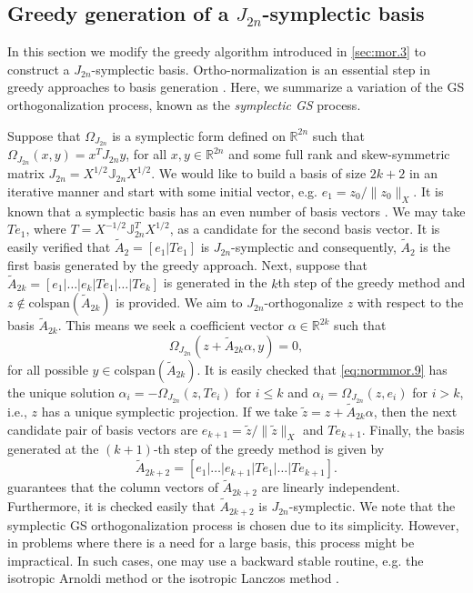 \subsection{Greedy generation of a $J_{2n}$-symplectic basis} \label{sec:normmor.2}
In this section we modify the greedy algorithm introduced in \cref{sec:mor.3} to construct a $J_{2n}$-symplectic basis. Ortho-normalization is an essential step in greedy approaches to basis generation \cite{hesthaven2015certified,quarteroni2015reduced}. Here, we summarize a variation of the GS orthogonalization process, known as the \emph{symplectic GS} process.

Suppose that $\Omega_{J_{2n}}$ is a symplectic form defined on $\mathbb R^{2n}$ such that $\Omega_{J_{2n}}(x,y) = x^T J_{2n} y$, for all $x,y\in \mathbb R^{2n}$ and some full rank and skew-symmetric matrix $J_{2n} = X^{1/2} \mathbb J_{2n} X^{1/2}$. We would like to build a basis of size $2k+2$ in an iterative manner and start with some initial vector, e.g. $e_1 = z_0/\| z_0 \|_X$. It is known that a symplectic basis has an even number of basis vectors \cite{Marsden:2010:IMS:1965128}. We may take $Te_1$, where $T = X^{-1/2} \mathbb J_{2n}^{T}X^{1/2}$, as a candidate for the second basis vector. It is easily verified that $\tilde A_2=[e_1|Te_1]$ is $J_{2n}$-symplectic and consequently, $\tilde A_2$ is the first basis generated by the greedy approach. Next, suppose that $\tilde A_{2k} = [e_1|\dots|e_k|Te_1|\dots|Te_k]$ is generated in the $k$th step of the greedy method and $z\not \in \text{colspan}\left(\tilde A_{2k}\right)$ is provided. We aim to $J_{2n}$-orthogonalize $z$ with respect to the basis $\tilde A_{2k}$. This means we seek a coefficient vector $\alpha\in \mathbb R^{2k}$ such that
\begin{equation} \label{eq:normmor.9}
	\Omega_{J_{2n}}\left( z + \tilde A_{2k}\alpha ,  y \right) = 0,
\end{equation}
for all possible $y \in \text{colspan}(\tilde A_{2k})$. It is easily checked that \eqref{eq:normmor.9} has the unique solution $\alpha_i = -\Omega_{J_{2n}}(z,Te_i)$ for $i\leq k$ and $\alpha_i = \Omega_{J_{2n}}(z,e_i)$ for $i>k$, i.e., $z$ has a unique symplectic projection. If we take $\tilde z = z + \tilde A_{2k}\alpha$, then the next candidate pair of basis vectors are $e_{k+1} = \tilde z / \| \tilde z \|_X$ and $Te_{k+1}$. Finally, the basis generated at the $(k+1)$-th step of the greedy method is given by
\begin{equation} \label{eq:normmor.11}
	\tilde A_{2k+2} = [e_1|\dots|e_{k+1}|Te_1|\dots|Te_{k+1}].
\end{equation}
 guarantees that the column vectors of $\tilde A_{2k+2}$ are linearly independent. Furthermore, it is checked easily that $\tilde A_{2k+2}$ is $J_{2n}$-symplectic. We note that the symplectic GS orthogonalization process is chosen due to its simplicity. However, in problems where there is a need for a large basis, this process might be impractical. In such cases, one may use a backward stable routine, e.g. the isotropic Arnoldi method or the isotropic Lanczos method \cite{doi:10.1137/S1064827500366434}.

